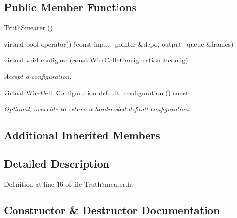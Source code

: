 \subsection*{Public Member Functions}
\begin{DoxyCompactItemize}
\item 
\hyperlink{class_wire_cell_1_1_gen_1_1_truth_smearer_a4b317b743e2ef497213deb36fc379479}{Truth\+Smearer} ()
\item 
virtual bool \hyperlink{class_wire_cell_1_1_gen_1_1_truth_smearer_a67cb4fc4a60604fe8034b5837f3a27a0}{operator()} (const \hyperlink{class_wire_cell_1_1_i_queuedout_node_acf5f716a764553f3c7055a9cf67e906e}{input\+\_\+pointer} \&depo, \hyperlink{class_wire_cell_1_1_i_queuedout_node_a39018e4e3dd886befac9636ac791a685}{output\+\_\+queue} \&frames)
\item 
virtual void \hyperlink{class_wire_cell_1_1_gen_1_1_truth_smearer_a75e03e4110e01b8ff31ad3aba5e7804d}{configure} (const \hyperlink{namespace_wire_cell_a9f705541fc1d46c608b3d32c182333ee}{Wire\+Cell\+::\+Configuration} \&config)
\begin{DoxyCompactList}\small\item\em Accept a configuration. \end{DoxyCompactList}\item 
virtual \hyperlink{namespace_wire_cell_a9f705541fc1d46c608b3d32c182333ee}{Wire\+Cell\+::\+Configuration} \hyperlink{class_wire_cell_1_1_gen_1_1_truth_smearer_a9ba841f3a493bb16e41d87e69448843c}{default\+\_\+configuration} () const
\begin{DoxyCompactList}\small\item\em Optional, override to return a hard-\/coded default configuration. \end{DoxyCompactList}\end{DoxyCompactItemize}
\subsection*{Additional Inherited Members}


\subsection{Detailed Description}


Definition at line 16 of file Truth\+Smearer.\+h.



\subsection{Constructor \& Destructor Documentation}
\mbox{\label{class_wire_cell_1_1_gen_1_1_truth_smearer_a4b317b743e2ef497213deb36fc379479}} 
